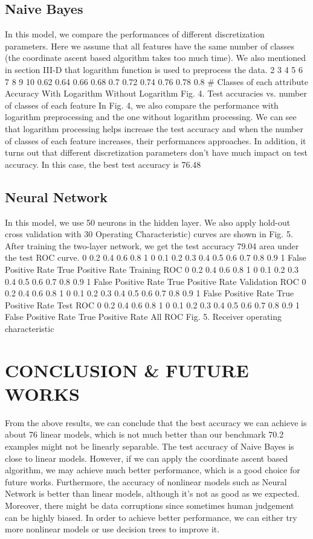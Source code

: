 \documentclass[conference]{IEEEtran}
\numberwithin{equation}{section}
\numberwithin{figure}{section}
\numberwithin{table}{section}
\begin{document}
\subsection{Naive Bayes}
In this model, we compare the performances of
different discretization parameters. Here we assume
that all features have the same number of classes
(the coordinate ascent based algorithm takes too
much time). We also mentioned in section III-D that
logarithm function is used to preprocess the data.
2 3 4 5 6 7 8 9 10
0.62
0.64
0.66
0.68
0.7
0.72
0.74
0.76
0.78
0.8
\# Classes of each attribute
Accuracy
With Logarithm
Without Logarithm
Fig. 4. Test accuracies vs. number of classes of each feature
In Fig. 4, we also compare the performance with
logarithm preprocessing and the one without logarithm
processing. We can see that logarithm processing
helps increase the test accuracy and when the
number of classes of each feature increases, their
performances approaches. In addition, it turns out
that different discretization parameters don’t have
much impact on test accuracy. In this case, the best
test accuracy is 76.48%
\subsection{Neural Network}
In this model, we use 50 neurons in the hidden
layer. We also apply hold-out cross validation with
30%
Operating Characteristic) curves are shown in Fig.
5. After training the two-layer network, we get the
test accuracy 79.04%
area under the test ROC curve.
0 0.2 0.4 0.6 0.8 1
0
0.1
0.2
0.3
0.4
0.5
0.6
0.7
0.8
0.9
1
False Positive Rate
True Positive Rate
Training ROC
0 0.2 0.4 0.6 0.8 1
0
0.1
0.2
0.3
0.4
0.5
0.6
0.7
0.8
0.9
1
False Positive Rate
True Positive Rate
Validation ROC
0 0.2 0.4 0.6 0.8 1
0
0.1
0.2
0.3
0.4
0.5
0.6
0.7
0.8
0.9
1
False Positive Rate
True Positive Rate
Test ROC
0 0.2 0.4 0.6 0.8 1
0
0.1
0.2
0.3
0.4
0.5
0.6
0.7
0.8
0.9
1
False Positive Rate
True Positive Rate
All ROC
Fig. 5. Receiver operating characteristic

\section{CONCLUSION \& FUTURE WORKS}
From the above results, we can conclude that the
best accuracy we can achieve is about 76%
linear models, which is not much better than our
benchmark 70.2%
examples might not be linearly separable. The test
accuracy of Naive Bayes is close to linear models.
However, if we can apply the coordinate ascent
based algorithm, we may achieve much better performance,
which is a good choice for future works.
Furthermore, the accuracy of nonlinear models such
as Neural Network is better than linear models,
although it’s not as good as we expected. Moreover,
there might be data corruptions since sometimes
human judgement can be highly biased. In order to
achieve better performance, we can either try more
nonlinear models or use decision trees to improve
it.
\end{document}
